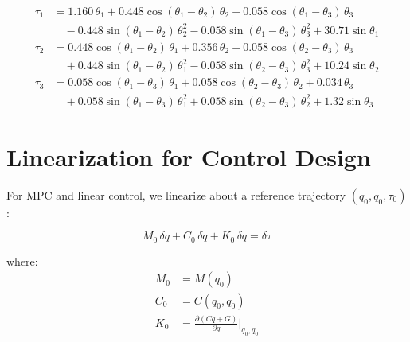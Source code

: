 \documentclass[11pt,a4paper]{article}
\newcommand{\vc}[1]{\bm{#1}}
\newcommand{\mat}[1]{\bm{#1}}
\newcommand{\dt}[1]{\dot{#1}}
\newcommand{\ddt}[1]{\ddot{#1}}
\newcommand{\pder}[2]{\frac{\partial #1}{\partial #2}}
\def\vc#1{#1}%
\def\mat#1{#1}%
\def\dt#1{#1}%
\def\ddt#1{#1}%
\def\bm#1{#1}%
\begin{document}
\begin{resultbox}
\begin{align}
    \tau_1 &= 1.160\,\ddt{\theta}_1 + 0.448\cos(\theta_1-\theta_2)\,\ddt{\theta}_2
            + 0.058\cos(\theta_1-\theta_3)\,\ddt{\theta}_3 \nonumber \\
           &\quad - 0.448\sin(\theta_1-\theta_2)\,\dt{\theta}_2^2
            - 0.058\sin(\theta_1-\theta_3)\,\dt{\theta}_3^2
            + 30.71\sin\theta_1 \\[6pt]
    \tau_2 &= 0.448\cos(\theta_1-\theta_2)\,\ddt{\theta}_1 + 0.356\,\ddt{\theta}_2
            + 0.058\cos(\theta_2-\theta_3)\,\ddt{\theta}_3 \nonumber \\
           &\quad + 0.448\sin(\theta_1-\theta_2)\,\dt{\theta}_1^2
            - 0.058\sin(\theta_2-\theta_3)\,\dt{\theta}_3^2
            + 10.24\sin\theta_2 \\[6pt]
    \tau_3 &= 0.058\cos(\theta_1-\theta_3)\,\ddt{\theta}_1 + 0.058\cos(\theta_2-\theta_3)\,\ddt{\theta}_2
            + 0.034\,\ddt{\theta}_3 \nonumber \\
           &\quad + 0.058\sin(\theta_1-\theta_3)\,\dt{\theta}_1^2
            + 0.058\sin(\theta_2-\theta_3)\,\dt{\theta}_2^2
            + 1.32\sin\theta_3
\end{align}
\end{resultbox}

\section{Linearization for Control Design}

For MPC and linear control, we linearize about a reference trajectory
$(\vc{q}_0, \dt{\vc{q}}_0, \vc{\tau}_0)$:

\begin{equation}
    \mat{M}_0 \, \delta\ddt{\vc{q}} + \vc{C}_0 \, \delta\dt{\vc{q}}
    + \vc{K}_0 \, \delta\vc{q} = \delta\vc{\tau}
    \label{eq:linearized}
\end{equation}

where:
\begin{align}
    \mat{M}_0 &= \mat{M}(\vc{q}_0) \\
    \vc{C}_0  &= \vc{C}(\vc{q}_0, \dt{\vc{q}}_0) \\
    \vc{K}_0  &= \pder{(\vc{C}\dt{\vc{q}} + \vc{G})}{\vc{q}}\bigg|_{\vc{q}_0, \dt{\vc{q}}_0}
\end{align}
\end{document}
